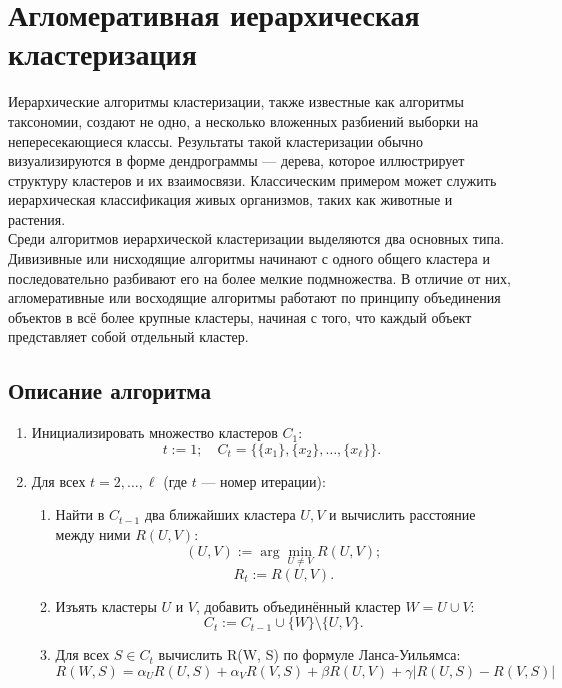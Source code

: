 \section{Агломеративная иерархическая кластеризация}
Иерархические алгоритмы кластеризации, также известные как алгоритмы таксономии, создают не одно, а несколько вложенных разбиений выборки на непересекающиеся классы. Результаты такой кластеризации обычно визуализируются в форме дендрограммы — дерева, которое иллюстрирует структуру кластеров и их взаимосвязи. Классическим примером может служить иерархическая классификация живых организмов, таких как животные и растения. \\
Среди алгоритмов иерархической кластеризации выделяются два основных типа. Дивизивные или нисходящие алгоритмы начинают с одного общего кластера и последовательно разбивают его на более мелкие подмножества. В отличие от них, агломеративные или восходящие алгоритмы работают по принципу объединения объектов в всё более крупные кластеры, начиная с того, что каждый объект представляет собой отдельный кластер.


\subsection{Описание алгоритма}
\begin{enumerate}
    \item Инициализировать множество кластеров $C_1$:
          \[
              t := 1; \quad C_t = \{\{x_1\}, \{x_2\}, \ldots, \{x_\ell\}\}.
          \]
    \item Для всех $t = 2, \ldots, \ell$ (где $t$ — номер итерации):
          \begin{enumerate}
              \item Найти в $C_{t-1}$ два ближайших кластера $U, V$ и вычислить расстояние между ними $R(U, V)$:
                    \[
                        (U, V) := \arg \min_{U \neq V} R(U, V);
                    \]
                    \[
                        R_t := R(U, V).
                    \]
              \item Изъять кластеры $U$ и $V$, добавить объединённый кластер $W = U \cup V$:
                    \[
                        C_t := C_{t-1} \cup \{W\} \setminus \{U, V\}.
                    \]
              \item Для всех $S \in C_t$ вычислить R(W, S) по формуле Ланса-Уильямса:
                    \[
                        R(W, S) = \alpha_U R(U, S) + \alpha_V R(V, S) + \beta R(U, V) + \gamma |R(U, S) - R(V, S)|
                    \]
          \end{enumerate}
\end{enumerate}

